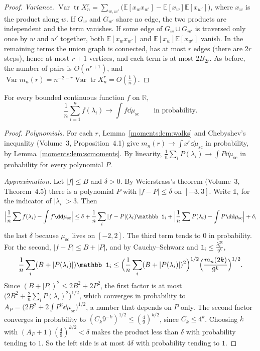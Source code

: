 \begin{proof}
\emph{Variance.} $\operatorname{Var}\operatorname{tr}X_n^r=\sum_{w,w'}\bigl(\mathbb E[x_wx_{w'}]-\mathbb E[x_w]\mathbb E[x_{w'}]\bigr)$, where $x_w$ is the product along $w$. If
$G_w$ and $G_{w'}$ share no edge, the two products are independent and the term vanishes. If some edge of $G_w\cup G_{w'}$ is traversed only once by $w$ and
$w'$ together, both $\mathbb E[x_wx_{w'}]$ and $\mathbb E[x_w]\mathbb E[x_{w'}]$ vanish. In the remaining terms the union graph is connected, has at most $r$ edges
(there are $2r$ steps), hence at most $r+1$ vertices, and each term is at most $2B_{2r}$. As before, the number of pairs is $O(n^{r+1})$, and
$\operatorname{Var}m_n(r)=n^{-2-r}\operatorname{Var}\operatorname{tr}X_n^r=O(\frac1n)$.
\end{proof}

\begin{theorem}[Wigner, 1955]\label{moments:thm:wigner}
For every bounded continuous function $f$ on $\mathbb R$,
\[
\frac1n\sum_{i=1}^nf(\lambda_i)\longrightarrow\int f\dd\mu_{\mathrm{sc}}\qquad\text{in probability.}
\]
\end{theorem}
\begin{proof}
\emph{Polynomials.} For each $r$, Lemma~\ref{moments:lem:walks} and Chebyshev's inequality (Volume~3, Proposition~4.1) give $m_n(r)\to\int x^r\dd\mu_{\mathrm{sc}}$ in
probability, by Lemma~\ref{moments:lem:scmoments}. By linearity, $\frac1n\sum_iP(\lambda_i)\to\int P\dd\mu_{\mathrm{sc}}$ in probability for every polynomial $P$.

\emph{Approximation.} Let $|f|\le B$ and $\delta>0$. By Weierstrass's theorem (Volume~3, Theorem~4.5) there is a polynomial $P$ with $|f-P|\le\delta$ on $[-3,3]$.
Write $\mathbb 1_i$ for the indicator of $|\lambda_i|>3$. Then
\[
\Bigl|\frac1n\sum f(\lambda_i)-\int f\dd\mu_{\mathrm{sc}}\Bigr|\le\delta+\frac1n\sum_i|f-P|(\lambda_i)\mathbb 1_i+\Bigl|\frac1n\sum P(\lambda_i)-\int P\dd\mu_{\mathrm{sc}}\Bigr|+\delta,
\]
the last $\delta$ because $\mu_{\mathrm{sc}}$ lives on $[-2,2]$. The third term tends to $0$ in probability. For the second, $|f-P|\le B+|P|$, and by
Cauchy--Schwarz and $\mathbb 1_i\le\frac{\lambda_i^{2k}}{9^k}$,
\[
\frac1n\sum_i(B+|P(\lambda_i)|)\mathbb 1_i\le\Bigl(\frac1n\sum_i(B+|P(\lambda_i)|)^2\Bigr)^{1/2}\Bigl(\frac{m_n(2k)}{9^k}\Bigr)^{1/2}.
\]
Since $(B+|P|)^2\le2B^2+2P^2$, the first factor is at most $\bigl(2B^2+\frac2n\sum_iP(\lambda_i)^2\bigr)^{1/2}$, which converges in probability to
$A_P=\bigl(2B^2+2\int P^2\dd\mu_{\mathrm{sc}}\bigr)^{1/2}$, a number that depends on $P$ only. The second factor converges in probability to $(C_k9^{-k})^{1/2}\le(\frac49)^{k/2}$,
since $C_k\le4^k$. Choosing $k$ with $(A_P+1)(\frac49)^{k/2}<\delta$ makes the product less than $\delta$ with probability tending to $1$.
So the left side is at most $4\delta$ with probability tending to $1$.
\end{proof}

